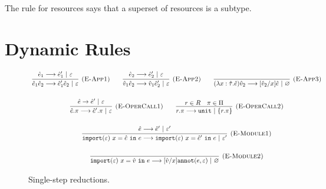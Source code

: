 The rule for resources says that a superset of resources is a subtype.













\section{Dynamic Rules}

\begin{figure}[h]

\noindent
{}

\[
\begin{array}{c}

\infer[\textsc{(E-App1)}]
	{\hat e_1 \hat e_2 \longrightarrow \hat e_1' \hat e_2~|~\varepsilon}
	{\hat e_1 \longrightarrow \hat e_1'~|~\varepsilon}
	~~~~~~
\infer[\textsc{(E-App2)}]
	{\hat v_1 \hat e_2 \longrightarrow \hat v_1 \hat e_2'~|~\varepsilon} 
	{\hat e_2 \longrightarrow \hat e_2'~|~\varepsilon}
~~~~~~
\infer[\textsc{(E-App3)}]
	{ (\lambda x: \hat \tau.\hat e) \hat v_2 \longrightarrow [\hat v_2/x]\hat e~|~\varnothing }
	{}\\[4ex]
	
\infer[\textsc{(E-OperCall1)}]
	{\hat e.\pi \longrightarrow \hat e'.\pi~|~\varepsilon }
	{\hat e \rightarrow \hat e'~|~\varepsilon}
		
	~~~~~~
	
\infer[\textsc{(E-OperCall2)}]
	{r.\pi \longrightarrow \kwa{unit}~|~\{ r.\pi \} }
	{r \in R & \pi \in \Pi}
	 \\[4ex]
	 
\infer[\textsc{(E-Module1)}]
	{\kwa{import}(\varepsilon)~x = \hat e~\kw{in} e \longrightarrow \kwa{import}(\varepsilon)~x = \hat e'~\kw{in} e~|~\varepsilon'}
	{\hat e \longrightarrow \hat e'~|~\varepsilon'}\\[4ex]

\infer[\textsc{(E-Module2)}]
	{\kwa{import}(\varepsilon)~x = \hat v~\kw{in} e \longrightarrow [\hat v/x]\kwa{annot}(e, \varepsilon)~|~\varnothing}
	{}

\end{array}
\]


\vspace{-7pt}
\caption{Single-step reductions.}
\label{This is the label.}
\end{figure}

